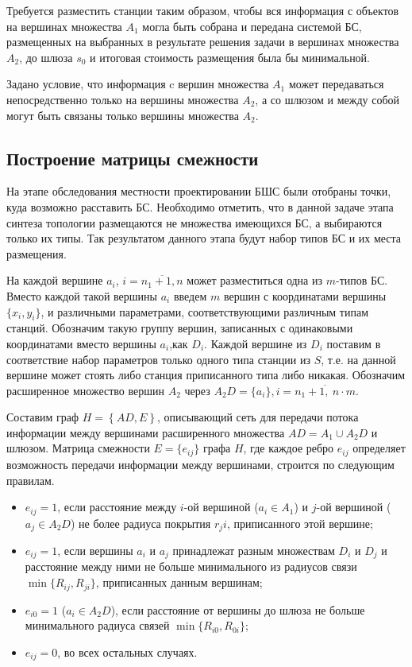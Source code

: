 Требуется разместить станции таким образом, чтобы вся информация с объектов на вершинах множества $A_1$ могла быть собрана и передана системой БС, размещенных на выбранных в результате решения задачи в вершинах множества  $A_2$, до шлюза $s_0$ и итоговая стоимость размещения была бы минимальной.


Задано условие, что информация c вершин множества $A_1$ может передаваться непосредственно только на вершины множества $A_2$, а со шлюзом и между собой могут быть связаны только вершины множества $A_2$.

\subsection{Построение матрицы смежности}

На этапе обследования местности проектировании БШС были отобраны точки, куда возможно расставить БС. Необходимо отметить, что в данной задаче этапа синтеза топологии размещаются не множества имеющихся БС, а выбираются только их типы. Так результатом данного этапа будут набор типов БС и их места размещения.

На каждой вершине $a_i$, $i= \overline{n_1+1,n}$ может разместиться одна из $m$-типов БС. Вместо каждой такой вершины $a_i$ введем $m$ вершин с координатами вершины $\{x_i, y_i \}$, и различными параметрами, соответствующими различным типам станций. Обозначим такую группу вершин, записанных с одинаковыми координатами вместо вершины $a_i$,как $D_i$. Каждой вершине из $D_i$ поставим в соответствие набор параметров только одного типа станции из $S$, т.е. на данной вершине может стоять либо станция приписанного типа либо никакая. Обозначим расширенное множество вершин $A_2$ через $A_2D = \{a_i\}, i = \overline{n_1 + 1,\ n \cdot m}$.

Составим граф $H=\left\{AD,E\right\}$, описывающий сеть для передачи потока информации между вершинами расширенного множества $AD=A_1 \cup A_2D$ и шлюзом.
Матрица смежности $E = \{e_{ij} \}$ графа $H$, где каждое ребро $e_{ij}$ определяет возможность передачи информации между вершинами, строится по следующим правилам.

\begin{itemize}
    \item $e_{ij} = 1$, если расстояние между $i$-ой вершиной ($a_i \in A_1$) и $j$-ой вершиной ($a_j \in A_2D$) не более радиуса покрытия $r_ji$, приписанного этой вершине;
    \item $e_{ij} = 1$, если вершины $a_i$ и $a_j$ принадлежат разным множествам $D_i$ и $D_j$ и расстояние между ними не больше минимального из радиусов связи $\min\{R_{ij}, R_{ji}\}$, приписанных данным вершинам;
    \item $e_{i0} = 1$ ($a_i \in A_2D$), если расстояние от вершины до шлюза не больше минимального радиуса связей $\min\{R_{i0}, R_{0i}\}$;
    \item $e_{ij} = 0$, во всех остальных случаях.
\end{itemize}

